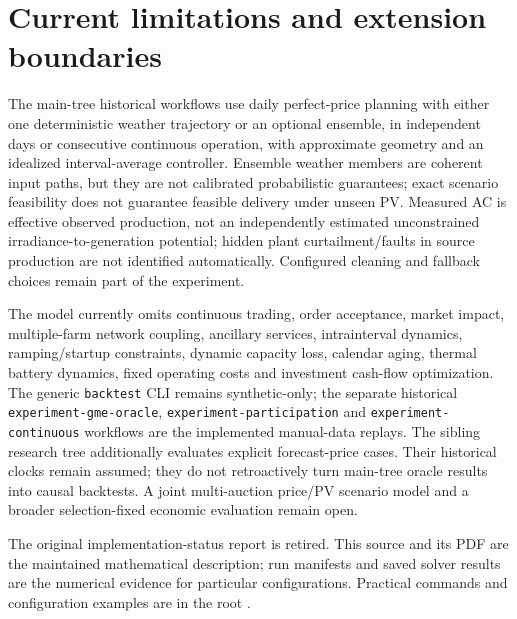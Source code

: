 \documentclass[11pt,a4paper]{article}
\begin{document}
\section{Current limitations and extension boundaries}

The main-tree historical workflows use daily perfect-price planning with either
one deterministic weather trajectory or an optional ensemble, in independent
days or consecutive continuous operation, with approximate geometry and an
idealized interval-average controller. Ensemble weather members are coherent
input paths, but they are not calibrated probabilistic guarantees; exact
scenario feasibility does not guarantee feasible delivery under unseen PV.
Measured AC is effective observed production, not an independently estimated
unconstrained irradiance-to-generation potential; hidden plant curtailment/faults
in source production are not identified automatically. Configured cleaning and
fallback choices remain part of the experiment.

The model currently omits continuous trading, order acceptance, market impact,
multiple-farm network coupling, ancillary services, intrainterval dynamics,
ramping/startup constraints, dynamic capacity loss, calendar aging, thermal
battery dynamics, fixed operating costs and investment cash-flow optimization.
The generic \texttt{backtest} CLI remains synthetic-only; the separate historical
\texttt{experiment-gme-oracle}, \texttt{experiment-participation} and
\texttt{experiment-continuous} workflows are the implemented manual-data replays.
The sibling research tree additionally evaluates explicit forecast-price
cases. Their historical clocks remain assumed; they do not retroactively turn
main-tree oracle results into causal backtests. A joint multi-auction price/PV
scenario model and a broader selection-fixed economic evaluation remain open.

The original implementation-status report is retired. This source and its PDF
are the maintained mathematical description; run manifests and saved solver
results are the numerical evidence for particular configurations. Practical
commands and configuration examples are in the root .


\end{document}
